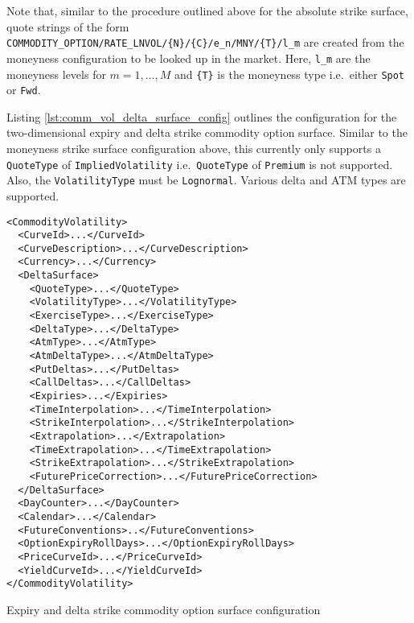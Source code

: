 Note that, similar to the procedure outlined above for the absolute strike surface, quote strings of the form \lstinline!COMMODITY_OPTION/RATE_LNVOL/{N}/{C}/e_n/MNY/{T}/l_m! are created from the moneyness configuration to be looked up in the market. Here, \lstinline!l_m! are the moneyness levels for $m=1,\ldots,M$ and \lstinline!{T}! is the moneyness type i.e.\ either \lstinline!Spot! or \lstinline!Fwd!.

Listing \ref{lst:comm_vol_delta_surface_config} outlines the configuration for the two-dimensional expiry and delta strike commodity option surface. Similar to the moneyness strike surface configuration above, this currently only supports a \lstinline!QuoteType! of \lstinline!ImpliedVolatility! i.e.\ \lstinline!QuoteType! of \lstinline!Premium! is not supported. Also, the \lstinline!VolatilityType! must be \lstinline!Lognormal!. Various delta and ATM types are supported.

\begin{longlisting}
\begin{verbatim}
<CommodityVolatility>
  <CurveId>...</CurveId>
  <CurveDescription>...</CurveDescription>
  <Currency>...</Currency>
  <DeltaSurface>
    <QuoteType>...</QuoteType>
    <VolatilityType>...</VolatilityType>
    <ExerciseType>...</ExerciseType>
    <DeltaType>...</DeltaType>
    <AtmType>...</AtmType>
    <AtmDeltaType>...</AtmDeltaType>
    <PutDeltas>...</PutDeltas>
    <CallDeltas>...</CallDeltas>
    <Expiries>...</Expiries>
    <TimeInterpolation>...</TimeInterpolation>
    <StrikeInterpolation>...</StrikeInterpolation>
    <Extrapolation>...</Extrapolation>
    <TimeExtrapolation>...</TimeExtrapolation>
    <StrikeExtrapolation>...</StrikeExtrapolation>
    <FuturePriceCorrection>...</FuturePriceCorrection>
  </DeltaSurface>
  <DayCounter>...</DayCounter>
  <Calendar>...</Calendar>
  <FutureConventions>..</FutureConventions>
  <OptionExpiryRollDays>...</OptionExpiryRollDays>
  <PriceCurveId>...</PriceCurveId>
  <YieldCurveId>...</YieldCurveId>
</CommodityVolatility>
\end{verbatim}
\caption{Expiry and delta strike commodity option surface configuration}
\label{lst:comm_vol_delta_surface_config}
\end{longlisting}

